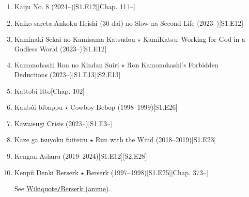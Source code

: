 \documentclass{article}
\begin{document}
\begin{enumerate}
    \item Kaiju No. 8 (2024--)\hfill[S1.E12][Chap. 111--]
    \item Kaiko sareta Ankoku Heishi (30-dai) no Slow na Second Life (2023--)\hfill[S1.E12]
    \item {\sc Kaminaki Sekai no Kamisama Katsudou $\star$ KamiKatsu: Working for God in a Godless World} (2023--)\hfill[S1.E12]
    \item {\sc Kamonohashi Ron no Kindan Suiri $\star$ Ron Kamonohashi's Forbidden Deductions} (2023--)\hfill[S1.E13][S2.E13]
    \item {\sc Kattobi Itto}\hfill[Chap. 102]
    \item {\sc Kaub\^oi bibappu $\star$ Cowboy Bebop} (1998--1999)\hfill[S1.E26]
    \item Kawaisugi Crisis (2023--)\hfill[S1.E3--]
    \item {\sc Kaze ga tsuyoku fuiteiru $\star$ Run with the Wind} (2018--2019)\hfill[S1.E23]
    \item {\sc Kengan Ashura} (2019--2024)\hfill[S1.E12][S2.E28]
    \item {\sc Kenp\^u Denki Berserk $\star$ Berserk} (1997--1998)\hfill[S1.E25][Chap. 373--]
    
    See \href{https://en.wikiquote.org/wiki/Berserk_(anime)}{Wikiquote{\tt/}Berserk (anime)}.
    

\end{enumerate}
\end{document}
